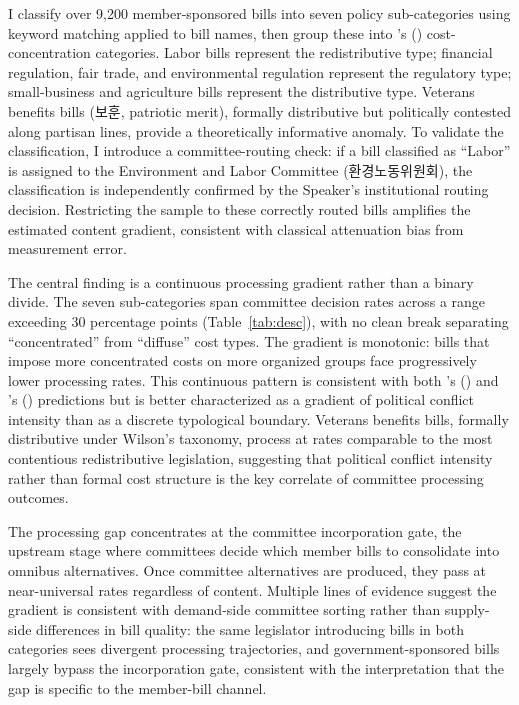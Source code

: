 \documentclass[11pt]{article}
\begin{document}
I classify over 9,200 member-sponsored bills into seven policy sub-categories using keyword matching applied to bill names, then group these into \citeauthor{wilson1980}'s (\citeyear{wilson1980}) cost-concentration categories. Labor bills represent the redistributive type; financial regulation, fair trade, and environmental regulation represent the regulatory type; small-business and agriculture bills represent the distributive type. Veterans benefits bills (보훈, patriotic merit), formally distributive but politically contested along partisan lines, provide a theoretically informative anomaly. To validate the classification, I introduce a committee-routing check: if a bill classified as ``Labor'' is assigned to the Environment and Labor Committee (환경노동위원회), the classification is independently confirmed by the Speaker's institutional routing decision. Restricting the sample to these correctly routed bills amplifies the estimated content gradient, consistent with classical attenuation bias from measurement error.

The central finding is a continuous processing gradient rather than a binary divide. The seven sub-categories span committee decision rates across a range exceeding 30 percentage points (Table~\ref{tab:desc}), with no clean break separating ``concentrated'' from ``diffuse'' cost types. The gradient is monotonic: bills that impose more concentrated costs on more organized groups face progressively lower processing rates. This continuous pattern is consistent with both \citeauthor{lowi1964}'s (\citeyear{lowi1964}) and \citeauthor{wilson1980}'s (\citeyear{wilson1980}) predictions but is better characterized as a gradient of political conflict intensity than as a discrete typological boundary. Veterans benefits bills, formally distributive under Wilson's taxonomy, process at rates comparable to the most contentious redistributive legislation, suggesting that political conflict intensity rather than formal cost structure is the key correlate of committee processing outcomes.

The processing gap concentrates at the committee incorporation gate, the upstream stage where committees decide which member bills to consolidate into omnibus alternatives. Once committee alternatives are produced, they pass at near-universal rates regardless of content. Multiple lines of evidence suggest the gradient is consistent with demand-side committee sorting rather than supply-side differences in bill quality: the same legislator introducing bills in both categories sees divergent processing trajectories, and government-sponsored bills largely bypass the incorporation gate, consistent with the interpretation that the gap is specific to the member-bill channel.
\end{document}
